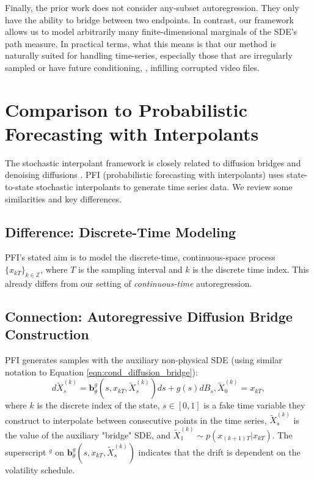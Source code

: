 \documentclass{article}
\begin{document}
Finally, the prior work \cite{zhou2023denoising, song2020score} does not consider any-subset autoregression. They only have the ability to bridge between two endpoints. In contrast, our framework allows us to model arbitrarily many finite-dimensional marginals of the SDE's path measure.
In practical terms, what this means is that our method is naturally suited for handling time-series, especially those that are irregularly sampled or have future conditioning, , infilling corrupted video files.
\newpage
\clearpage

\section{Comparison to Probabilistic Forecasting with Interpolants}\label{sec:pfi_comparison}

The stochastic interpolant framework is closely related to diffusion bridges and denoising diffusions \cite{albergo2023stochastic, chen2024probabilistic}. %
PFI (probabilistic forecasting with interpolants) uses state-to-state stochastic interpolants to generate time series data. We review some similarities and key differences.



\subsection{Difference: Discrete-Time Modeling}

PFI's stated aim is to model the discrete-time, continuous-space process $\{x_{kT}\}_{k \in \mathbb{Z}}$, where $T$ is the sampling interval and $k$ is the discrete time index. This already differs from our setting of \textit{continuous-time} autoregression.

\subsection{Connection: Autoregressive Diffusion Bridge Construction}

PFI generates samples with the auxiliary non-physical SDE (using similar notation to Equation \ref{eqn:cond_diffusion_bridge}):
\begin{equation}\label{eqn:pfi_sde}
    d\tilde{X}^{(k)}_{s} = \mathbf{b}^g_\theta\left(s, x_{kT}, \tilde{X}^{(k)}_{s}\right)ds + g(s)dB_s, \tilde{X}^{(k)}_{0} = x_{kT},
\end{equation}
where $k$ is the discrete index of the state, $s \in [0, 1]$ is a fake time variable they construct to interpolate between consecutive points in the time series, $\tilde{X}^{(k)}_{s}$ is the value of the auxiliary "bridge" SDE, and $\tilde{X}^{(k)}_{1} \sim p\left(x_{(k+1)T} | x_{kT}\right)$. The superscript $^g$ on $\mathbf{b}^g_\theta\left(s, x_{kT}, \tilde{X}^{(k)}_{s}\right)$ indicates that the drift is dependent on the volatility schedule.
\end{document}
